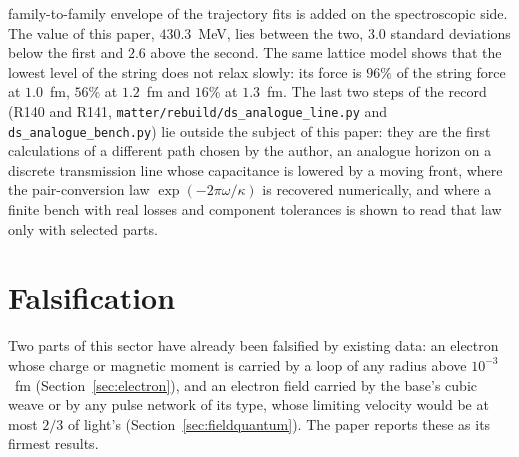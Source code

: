 \documentclass[11pt,a4paper]{article}
\theoremstyle{plain}
\theoremstyle{remark}
\begin{document}
family-to-family envelope of the trajectory fits is added on the spectroscopic side. The value of this paper,
$430.3$~MeV, lies between the two, $3.0$ standard deviations below the first and $2.6$ above the second. The same
lattice model shows that the lowest level of the string does not relax slowly: its force is $96\%$ of the string
force at $1.0$~fm, $56\%$ at $1.2$~fm and $16\%$ at $1.3$~fm. The last two steps of the record (R140 and R141,
\texttt{matter/rebuild/ds\_analogue\_line.py} and \texttt{ds\_analogue\_bench.py}) lie outside the subject of this
paper: they are the first calculations of a different path chosen by the author, an analogue horizon on a discrete
transmission line whose capacitance is lowered by a moving front, where the pair-conversion law
$\exp(-2\pi\omega/\kappa)$ is recovered numerically, and where a finite bench with real losses and component
tolerances is shown to read that law only with selected parts.

\section{Falsification}\label{sec:falsification}

Two parts of this sector have already been falsified by existing data: an electron whose charge
or magnetic moment is carried by a loop of any radius above $10^{-3}$~fm
(Section~\ref{sec:electron}), and an electron field carried by the base's cubic weave or by any
pulse network of its type, whose limiting velocity would be at most $2/3$ of light's
(Section~\ref{sec:fieldquantum}). The paper reports
these as its firmest results.
\end{document}

